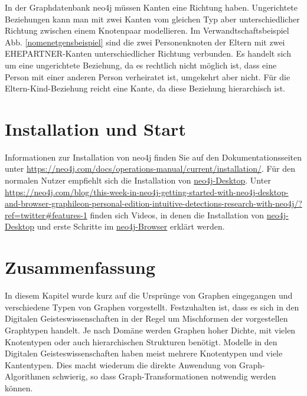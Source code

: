 \documentclass[ngerman,]{scrreprt}
\begin{document}
In der Graphdatenbank neo4j müssen Kanten eine Richtung haben. Ungerichtete Beziehungen kann man mit zwei Kanten vom gleichen Typ aber unterschiedlicher Richtung zwischen einem Knotenpaar modellieren. Im Verwandtschaftsbeispiel Abb. \ref{nomenetgensbeispiel} sind die zwei Personenknoten der Eltern mit zwei EHEPARTNER-Kanten unterschiedlicher Richtung verbunden. Es handelt sich um eine ungerichtete Beziehung, da es rechtlich nicht möglich ist, dass eine Person mit einer anderen Person verheiratet ist, umgekehrt aber nicht. Für die Eltern-Kind-Beziehung reicht eine Kante, da diese Beziehung hierarchisch ist.

\hypertarget{installation-und-start}{%
\section{Installation und Start}\label{installation-und-start}}

Informationen zur Installation von neo4j finden Sie auf den Dokumentationsseiten unter \url{https://neo4j.com/docs/operations-manual/current/installation/}. Für den normalen Nutzer empfiehlt sich die Installation von \href{https://neo4j.com/download/}{neo4j-Desktop}. Unter \url{https://neo4j.com/blog/this-week-in-neo4j-getting-started-with-neo4j-desktop-and-browser-graphileon-personal-edition-intuitive-detections-research-with-neo4j/?ref=twitter\#features-1} finden sich Videos, in denen die Installation von \href{https://www.youtube.com/watch?v=8yWhuUnPapw}{neo4j-Desktop} und erste Schritte im \href{https://www.youtube.com/watch?v=rQTximyaETA}{neo4j-Browser} erklärt werden.

\hypertarget{zusammenfassung}{%
\section{Zusammenfassung}\label{zusammenfassung}}

In diesem Kapitel wurde kurz auf die Ursprünge von Graphen eingegangen und verschiedene Typen von Graphen vorgestellt. Festzuhalten ist, dass es sich in den Digitalen Geisteswissenschaften in der Regel um Mischformen der vorgestellen Graphtypen handelt. Je nach Domäne werden Graphen hoher Dichte, mit vielen Knotentypen oder auch hierarchischen Strukturen benötigt. Modelle in den Digitalen Geisteswissenschaften haben meist mehrere Knotentypen und viele Kantentypen. Dies macht wiederum die direkte Anwendung von Graph-Algorithmen schwierig, so dass Graph-Transformationen notwendig werden können.
\end{document}
